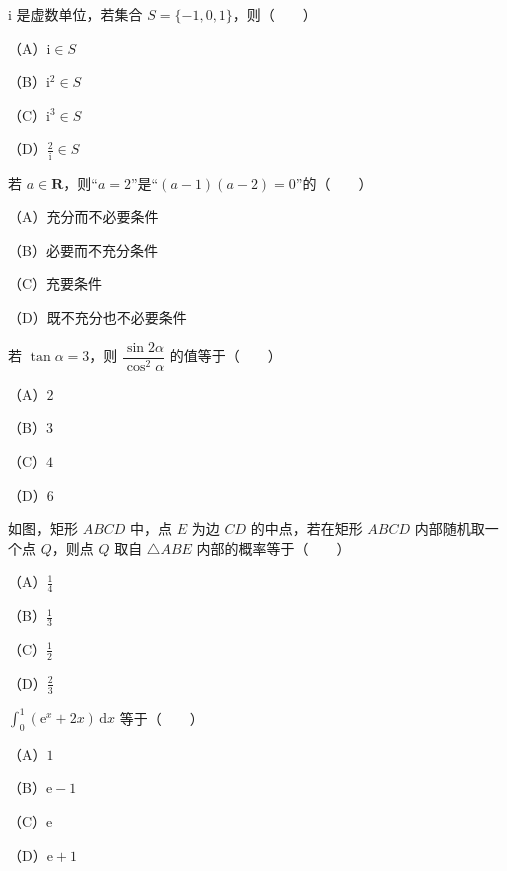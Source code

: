 

\begin{question}
$\mathrm i$ 是虚数单位，若集合 $S=\{-1,0,1\}$，则\mbox{（　　）}

（A）$\mathrm i\in S$

（B）$\mathrm i^2\in S$

（C）$\mathrm i^3\in S$

（D）$\frac2{\mathrm i}\in S$

\end{question}
\begin{question}
若 $a\in\mathbf R$，则“$a=2$”是“$(a-1)(a-2)=0$”的\mbox{（　　）}

（A）充分而不必要条件

（B）必要而不充分条件

（C）充要条件

（D）既不充分也不必要条件

\end{question}
\begin{question}
若 $\tan\alpha=3$，则 $\dfrac{\sin2\alpha}{\cos^2\alpha}$ 的值等于\mbox{（　　）}

（A）$2$

（B）$3$

（C）$4$

（D）$6$

\Needspace{0.4\textheight}
\end{question}
\begin{question}
如图，矩形 $ABCD$ 中，点 $E$ 为边 $CD$ 的中点，若在矩形 $ABCD$ 内部随机取一个点 $Q$，则点 $Q$ 取自 $\triangle ABE$ 内部的概率等于\mbox{（　　）}

（A）$\frac14$

（B）$\frac13$

（C）$\frac12$

（D）$\frac23$
\nopagebreak[4]
\begin{center}\end{center}
\nopagebreak[4]
\end{question}
\begin{question}
$\displaystyle\int_0^1(\mathrm e^x+2x)\,\mathrm dx$ 等于\mbox{（　　）}

（A）$1$

（B）$\mathrm e-1$

（C）$\mathrm e$

（D）$\mathrm e+1$

\end{question}
